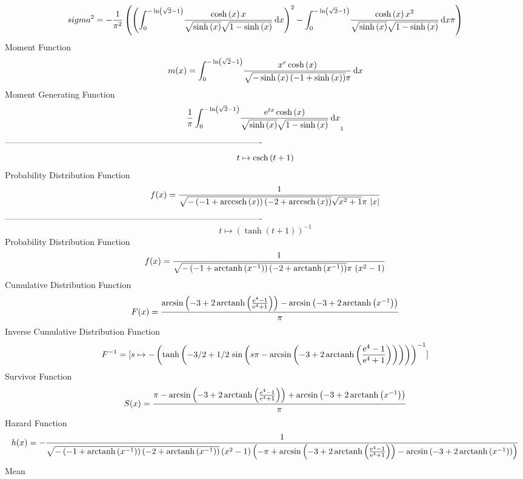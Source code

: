 \documentclass[12pt]{article}
\begin{document}
 $$ sigma^2 = -{\frac {1}{{\pi}^{2}} \left(  \left( \int_{0}^{-\ln  \left( \sqrt {2}
-1 \right) }\!{\frac {\cosh \left( x \right) x}{\sqrt {\sinh \left( x
 \right) }\sqrt {1-\sinh \left( x \right) }}}\,{\rm d}x \right) ^{2}-
\int_{0}^{-\ln  \left( \sqrt {2}-1 \right) }\!{\frac {\cosh \left( x
 \right) {x}^{2}}{\sqrt {\sinh \left( x \right) }\sqrt {1-\sinh
 \left( x \right) }}}\,{\rm d}x\pi \right) }
$$ Moment Function 
 $$ m(x) = \int_{0}^{-\ln  \left( \sqrt {2}-1 \right) }\!{\frac {{x}^{r}\cosh
 \left( x \right) }{\sqrt {-\sinh \left( x \right)  \left( -1+\sinh
 \left( x \right)  \right) }\pi}}\,{\rm d}x
$$ Moment Generating Function 
 $${\frac {1}{\pi}\int_{0}^{-\ln  \left( \sqrt {2}-1 \right) }\!{\frac {{
{\rm e}^{tx}}\cosh \left( x \right) }{\sqrt {\sinh \left( x \right) }
\sqrt {1-\sinh \left( x \right) }}}\,{\rm d}x}_{{1}}
$$-------------------------------------------------------------------------------------------  \\$$t\mapsto {\rm csch} \left(t+1\right)
$$Probability Distribution Function 
$$  f(x)={\frac {1}{\sqrt {- \left( -1+{\rm arccsch} \left(x\right) \right) 
 \left( -2+{\rm arccsch} \left(x\right) \right) }\sqrt {{x}^{2}+1}\pi
\, \left| x \right| }}
$$-------------------------------------------------------------------------------------------  \\$$t\mapsto  \left( \tanh \left( t+1 \right)  \right) ^{-1}
$$Probability Distribution Function 
$$  f(x)={\frac {1}{\sqrt {- \left( -1+{\rm arctanh} \left({x}^{-1}\right)
 \right)  \left( -2+{\rm arctanh} \left({x}^{-1}\right) \right) }\pi\,
 \left( {x}^{2}-1 \right) }}
$$Cumulative Distribution Function  
 $$F(x)={\frac {\arcsin \left( -3+2\,{\rm arctanh} \left({\frac {{{\rm e}^{4}}
-1}{{{\rm e}^{4}}+1}}\right) \right) -\arcsin \left( -3+2\,
{\rm arctanh} \left({x}^{-1}\right) \right) }{\pi}}
$$ Inverse Cumulative Distribution Function 
  $$F^{-1} = [s\mapsto - \left( \tanh \left( -3/2+1/2\,\sin \left( s\pi-\arcsin
 \left( -3+2\,{\rm arctanh} \left({\frac {{{\rm e}^{4}}-1}{{{\rm e}^{4
}}+1}}\right) \right)  \right)  \right)  \right) ^{-1}]
$$Survivor Function 
 $$ S(x)={\frac {\pi-\arcsin \left( -3+2\,{\rm arctanh} \left({\frac {{{\rm e}^
{4}}-1}{{{\rm e}^{4}}+1}}\right) \right) +\arcsin \left( -3+2\,
{\rm arctanh} \left({x}^{-1}\right) \right) }{\pi}}
$$ Hazard Function 
 $$ h(x)=-{\frac {1}{\sqrt {- \left( -1+{\rm arctanh} \left({x}^{-1}\right)
 \right)  \left( -2+{\rm arctanh} \left({x}^{-1}\right) \right) }
 \left( {x}^{2}-1 \right)  \left( -\pi+\arcsin \left( -3+2\,
{\rm arctanh} \left({\frac {{{\rm e}^{4}}-1}{{{\rm e}^{4}}+1}}\right)
 \right) -\arcsin \left( -3+2\,{\rm arctanh} \left({x}^{-1}\right)
 \right)  \right) }}
$$ Mean 
\end{document}

